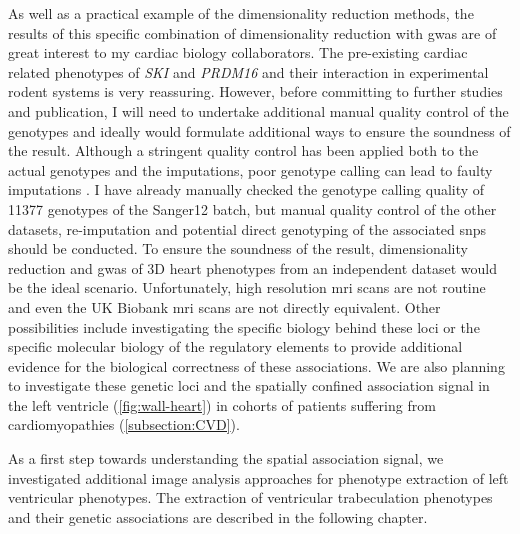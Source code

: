 As well as a practical example of the dimensionality reduction methods, the results of this specific combination of dimensionality reduction with \gls{gwas} are of great interest to my cardiac biology collaborators. The pre-existing cardiac related phenotypes of \textit{SKI} and \textit{PRDM16} and their interaction in experimental rodent systems is very reassuring. However, before committing to further studies and publication, I will need to undertake additional manual quality control of the genotypes and ideally would formulate additional ways to ensure the soundness of the result. Although a stringent quality control has been applied both to the actual genotypes and the imputations, poor genotype calling can lead to faulty imputations \citep{Morris2010}. I have already manually checked the genotype calling quality of \num{11377} genotypes of the Sanger12 batch, but manual quality control of the other datasets, re-imputation and potential direct genotyping of the associated \glspl{snp} should be conducted. To ensure the soundness of the result, dimensionality reduction and \gls{gwas} of 3D heart phenotypes from an independent dataset would be the ideal scenario. Unfortunately, high resolution \gls{mri} scans are not routine and even the UK Biobank \gls{mri} scans are not directly equivalent. Other possibilities include investigating the specific biology behind these loci or the specific molecular biology of the regulatory elements to provide additional evidence for the biological correctness of these associations. We are also planning to investigate these genetic loci and the spatially confined association signal in the left ventricle (\cref{fig:wall-heart}) in cohorts of patients suffering from cardiomyopathies (\cref{subsection:CVD}). 

As a first step towards understanding the spatial association signal, we investigated additional image analysis approaches for phenotype extraction of left ventricular phenotypes. The extraction of ventricular trabeculation phenotypes and their genetic associations are described in the following chapter.


